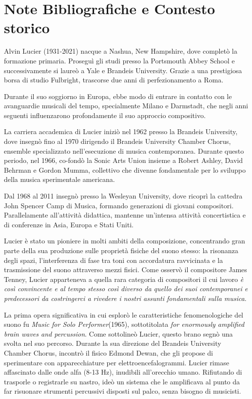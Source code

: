 
\section{Note Bibliografiche e Contesto storico}
Alvin Lucier (1931-2021) nacque a Nashua, New Hampshire, dove completò la formazione primaria. Proseguì gli studi presso la Portsmouth Abbey School e successivamente si laureò a Yale e Brandeis University. Grazie a una prestigiosa borsa di studio Fulbright, trascorse due anni di perfezionamento a Roma.

Durante il suo soggiorno in Europa, ebbe modo di entrare in contatto con le avanguardie musicali del tempo, specialmente Milano e Darmstadt, che negli anni seguenti influenzarono profondamente il suo approccio compositivo.

La carriera accademica di Lucier iniziò nel 1962 presso la Brandeis University, dove insegnò fino al 1970 dirigendo il Brandeis University Chamber Chorus, ensemble specializzato nell'esecuzione di musica contemporanea. Durante questo periodo, nel 1966, co-fondò la Sonic Arts Union insieme a Robert Ashley, David Behrman e Gordon Mumma, collettivo che divenne fondamentale per lo sviluppo della musica sperimentale americana.

Dal 1968 al 2011 insegnò presso la Wesleyan University, dove ricoprì la cattedra John Spencer Camp di Musica, formando generazioni di giovani compositori. Parallelamente all'attività didattica, mantenne un'intensa attività concertistica e di conferenze in Asia, Europa e Stati Uniti.

Lucier è stato un pioniere in molti ambiti della composizione, concentrando gran parte della sua produzione sulle proprietà fisiche del suono stesso: la risonanza degli spazi, l'interferenza di fase tra toni con accordatura ravvicinata e la trasmissione del suono attraverso mezzi fisici. Come osservò il compositore James Tenney, Lucier apparteneva a quella rara categoria di compositori il cui lavoro \textit{è così convincente e al tempo stesso così diverso da quello dei suoi contemporanei e predecessori da costringerci a rivedere i nostri assunti fondamentali sulla musica}.

La prima opera significativa in cui esplorò le caratteristiche fenomenologiche del suono fu \textit{Music for Solo Performer}(1965), sottotitolata \textit{for enormously amplified brain waves and percussion}. Come sottolineò Lucier, questo brano segnò una svolta nel suo percorso. Durante la sua direzione del Brandeis University Chamber Chorus, incontrò il fisico Edmond Dewan, che gli propose di sperimentare con apparecchiature per elettroencefalogrammi. Lucier rimase affascinato dalle onde alfa (8-13 Hz), inudibili all'orecchio umano. Rifiutando di trasporle o registrarle su nastro, ideò un sistema che le amplificava al punto da far risuonare strumenti percussivi disposti sul palco, senza bisogno di musicisti.

